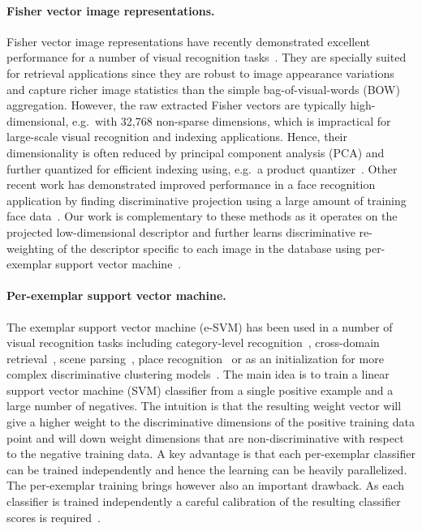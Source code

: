 \documentclass[10pt,twocolumn,letterpaper]{article}
\begin{document}
\paragraph{Fisher vector image representations.} %
    Fisher vector image representations have recently demonstrated excellent performance for a number of visual recognition tasks~\cite{Chatfield11,Jegou12,Krapac2011,Simonyan2013}. They are specially suited for retrieval applications since they are robust to image appearance variations and capture richer image statistics than the simple bag-of-visual-words (BOW) aggregation. However, the raw extracted Fisher vectors are typically high-dimensional, e.g.\ with 32,768 non-sparse dimensions, which is impractical for large-scale visual recognition and indexing applications. Hence, their dimensionality is often reduced by principal component analysis (PCA) and further quantized for efficient indexing using, e.g.\ a product quantizer~\cite{Jegou12}.  Other recent work has demonstrated improved performance in a face recognition application by finding discriminative projection using a large amount of training face data~\cite{Simonyan2013}. Our work is complementary to these methods as it operates on the projected low-dimensional descriptor and further learns discriminative re-weighting of the descriptor specific to each image in the database using per-exemplar support vector machine~\cite{Malisiewicz11}.

\paragraph{Per-exemplar support vector machine.} %
    The exemplar support vector machine (e-SVM) has been used in a number of visual recognition tasks including category-level recognition~\cite{Malisiewicz11}, cross-domain retrieval~\cite{Shrivastava11}, scene parsing~\cite{Tighe13}, place recognition~\cite{Gronat13} or as an initialization  for more complex discriminative clustering models~\cite{Doersch12,Singh12}. The main idea is to train a linear support vector machine (SVM) classifier from a single positive example and a large number of negatives. The intuition is that the resulting weight vector will give a higher weight to the discriminative dimensions of the positive training data point and will down weight dimensions that are non-discriminative with respect to the negative training data. A key advantage is that each per-exemplar classifier can be trained independently and hence the learning can be heavily parallelized. The per-exemplar training brings however also an important drawback. As each classifier is trained independently a careful calibration of the resulting classifier scores is required~\cite{Gronat13,Malisiewicz11}. 
\end{document}
